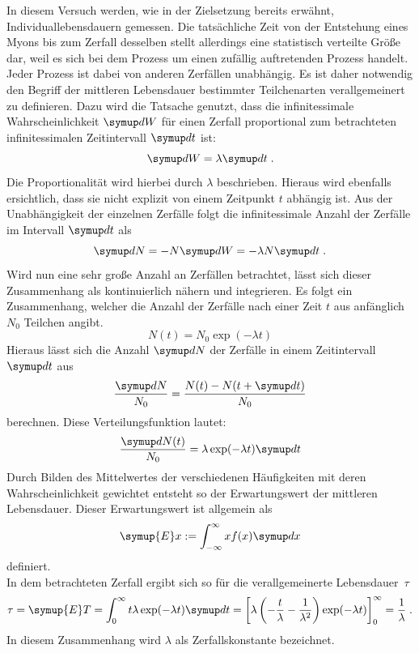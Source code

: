 In diesem Versuch werden, wie in der Zielsetzung bereits erwähnt,
Individuallebensdauern gemessen. Die tatsächliche Zeit von der Entstehung eines
Myons bis zum Zerfall desselben stellt allerdings eine statistisch verteilte
Größe dar, weil es sich bei dem Prozess um einen zufällig auftretenden Prozess
handelt. Jeder Prozess ist dabei von anderen Zerfällen unabhängig. Es ist daher
notwendig den Begriff der mittleren Lebensdauer bestimmter Teilchenarten
verallgemeinert zu definieren. Dazu wird die Tatsache genutzt, dass die
infinitessimale Wahrscheinlichkeit $\upd W$ für einen Zerfall proportional zum
betrachteten infinitessimalen Zeitintervall $\upd t$ ist:
%
\begin{equation}
  \upd W=\lambda\upd t \; .
\end{equation}
%
Die Proportionalität wird hierbei durch $\lambda$ beschrieben. Hieraus wird
ebenfalls ersichtlich, dass sie nicht explizit von einem Zeitpunkt $t$ abhängig
ist. Aus der Unabhängigkeit der einzelnen Zerfälle folgt die infinitessimale
Anzahl der Zerfälle im Intervall $\upd t$ als
%
\begin{equation}
  \upd N=-N\upd W=-\lambda N\upd t \; .
\end{equation}
%
Wird nun eine sehr große Anzahl an Zerfällen betrachtet, lässt sich dieser
Zusammenhang als kontinuierlich nähern und integrieren. Es folgt ein
Zusammenhang, welcher die Anzahl der Zerfälle nach einer Zeit $t$ aus anfänglich
$N_0$ Teilchen angibt.
%
\begin{equation}
  N(t)=N_0\exp(-\lambda t)
\end{equation}
%
Hieraus lässt sich die Anzahl $\upd N$ der Zerfälle in einem Zeitintervall $\upd t$ aus
%
\begin{equation}
  \frac{\upd N}{N_0}=\frac{N(t)-N(t+\upd t)}{N_0}
\end{equation}
%
berechnen. Diese Verteilungsfunktion lautet:
%
\begin{equation}
  \frac{\upd N(t)}{N_0}=\lambda\exp(-\lambda t)\upd t
\end{equation}
%
Durch Bilden des Mittelwertes der verschiedenen Häufigkeiten mit deren
Wahrscheinlichkeit gewichtet entsteht so der Erwartungswert der mittleren
Lebensdauer. Dieser Erwartungswert ist allgemein als
%
\begin{equation}
  \symup{E}x:=\int_{-\infty}^{\infty}xf(x)\upd x
\end{equation}
%
definiert. \\ In dem betrachteten Zerfall ergibt sich so für die verallgemeinerte Lebensdauer~$\tau$
%
\begin{equation}
  \tau=\symup{E}T=\int_0^\infty t\lambda\exp(-\lambda t)\upd t=\left[\lambda\left(-\frac{t}{\lambda}-\frac{1}{\lambda^2}\right)\exp(-\lambda t)\right]^\infty_0=\frac{1}{\lambda} \; .
\end{equation}
%
In diesem Zusammenhang wird $\lambda$ als Zerfallskonstante bezeichnet.
